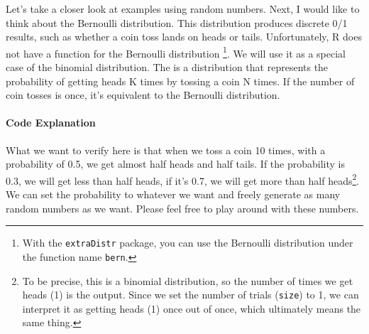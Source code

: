 \documentclass{ltjsbook}
\begin{document}
Let's take a closer look at examples using random numbers. Next, I would like to think about the Bernoulli distribution. This distribution produces discrete 0/1 results, such as whether a coin toss lands on heads or tails.
Unfortunately, R does not have a function for the Bernoulli distribution \footnote{With the \texttt{extraDistr} package, you can use the Bernoulli distribution under the function name \texttt{bern}.}. We will use it as a special case of the binomial distribution. The  is a distribution that represents the probability of getting heads K times by tossing a coin N times. If the number of coin tosses is once, it’s equivalent to the Bernoulli distribution.

\paragraph{Code Explanation}


What we want to verify here is that when we toss a coin 10 times, with a probability of 0.5, we get almost half heads and half tails. If the probability is 0.3, we will get less than half heads, if it's 0.7, we will get more than half heads\footnote{To be precise, this is a binomial distribution, so the number of times we get heads (1) is the output. Since we set the number of trials (\texttt{size}) to 1, we can interpret it as getting heads (1) once out of once, which ultimately means the same thing.}. We can set the probability to whatever we want and freely generate as many random numbers as we want. Please feel free to play around with these numbers.
\end{document}

